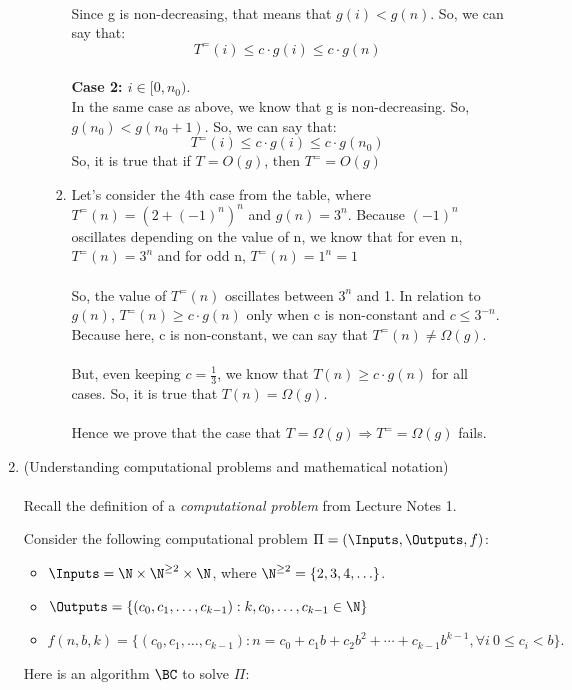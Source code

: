 \documentclass[11pt]{article}
\begin{document}
\begin{enumerate}
\begin{enumerate}
\begin{enumerate}
    \\ Since g is non-decreasing, that means that $g(i) < g(n)$. So, we can say that:
    \begin{equation*}
         T^{=}(i) \leq c \cdot g(i) \leq c \cdot g(n)
    \end{equation*}
    \\ \textbf{Case 2: $i \in [0, n_0)$}. 
    \\ In the same case as above, we know that g is non-decreasing. So, $g(n_0) < g(n_0 + 1)$. So, we can say that:
    \begin{equation*}
         T^{=}(i) \leq c \cdot g(i) \leq c \cdot g(n_0)
    \end{equation*}
    So, it is true that if $T = O(g)$, then $T^{=}=O(g)$
    \\ 
    \item  Let's consider the 4th case from the table, where $T^{=}(n) = (2 + (-1)^n)^n$ and $g(n) = 3^n$. Because $(-1)^n$ oscillates depending on the value of n, we know that for even n, $T^{=}(n) = 3^n$ and for odd n, $T^{=}(n) = 1^n = 1$
    \\\\ So, the value of $T^{=}(n)$ oscillates between $3^n$ and 1. In relation to $g(n)$, $T^{=}(n) \geq c \cdot g(n)$ only when c is non-constant and $c \leq 3^{-n}$. Because here, c is non-constant, we can say that $T^{=}(n) \neq \Omega(g)$.
    \\\\ But, even keeping $c = \frac{1}{3}$, we know that $T(n) \geq c \cdot g(n)$ for all cases. So, it is true that $T(n) = \Omega(g)$.
    \\\\ Hence we prove that the case that $T=\Omega(g) \Rightarrow T^{=}=\Omega(g)$ fails. 
    \end{enumerate}

 
    \end{enumerate}
    
    \newpage
    \item (Understanding computational problems and mathematical notation)\\\\
    Recall the definition of a {\em computational problem} from Lecture Notes 1.  \label{prob:BC}

 
    Consider the following computational problem $\Pi=(\Inputs,\Outputs,f)$: 
    \begin{itemize}                                
    \item $\Inputs = \N\times\N^{\geq 2}\times \N$, where $\N^{\geq 2} = \{2,3,4,\ldots\}$.  
    \item $\Outputs = \{(c_0,c_1,\ldots,c_{k-1}) : k,c_0,\ldots,c_{k-1}\in \N\}$
    \item $f(n,b,k) = \{ (c_0,c_1,\ldots,c_{k-1}) : n=c_0+c_1b+c_2b^2+\cdots+c_{k-1}b^{k-1}, \forall i\ 0\leq c_i< b\}.$ 
    \end{itemize}
Here is an algorithm $\BC$ to solve $\Pi$: 
    

\end{enumerate}
\end{document}
